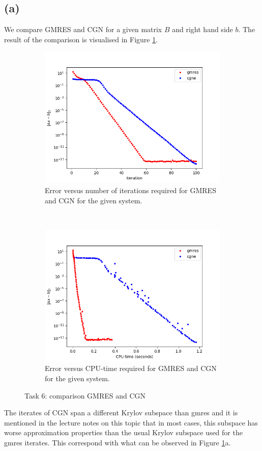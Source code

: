 \subsection{(a)}
We compare GMRES and CGN for a given matrix $B$ and right hand side $b$. The result of the comparison is visualised in Figure \ref{task6}.
\begin{figure}[h!]
	\centering
	\begin{subfigure}[t]{0.49\textwidth}
		\includegraphics[width=\textwidth]{error_itr.png}
		\caption{Error versus number of iterations required for GMRES and CGN for the given system.}
	\end{subfigure}~
	\begin{subfigure}[t]{0.49\textwidth}
		\includegraphics[width=\textwidth]{error_time.png}	
		\caption{Error versus CPU-time required for GMRES and CGN for the given system.}
	\end{subfigure}
	\caption{Task 6: comparison GMRES and CGN}
	\label{task6}
\end{figure}
The iterates of CGN span a different Krylov subspace than gmres and it is mentioned in the lecture notes on this topic that in most cases, this subspace has worse approximation properties than the usual Krylov subspace used for the gmres iterates. This correspond with what can be observed in Figure \ref{task6}a. 
